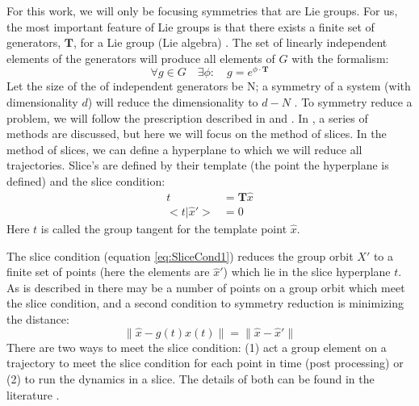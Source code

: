 \documentclass[aip,cha,reprint,
secnumarabic,
nofootinbib, tightenlines,
nobibnotes, showkeys, showpacs,
groupedaddress
]{revtex4-1}
\begin{document}
For this work, we will only be focusing symmetries that are Lie groups.  For us, the most important feature of Lie groups is that there exists a finite set of generators, $\mathbf{T}$, for a Lie group (Lie algebra) \cite{CB}.  The set of linearly independent elements of the generators will produce all elements of $G$ with the formalism:
\begin{equation}
\forall g \in G \quad \exists \phi: \quad  g = e^{\phi \cdot \mathbf{T}}
\label{eq:SymmGen}
\end{equation}
Let the size of the of independent generators be N; a symmetry of a system (with dimensionality $d$) will reduce the dimensionality to $d-N$ \cite{Atl}.
To symmetry reduce a problem, we will follow the prescription described in \cite{SliceCond} and \cite{Atl}.  In \cite{Atl}, a series of methods are discussed, but here we will focus on the method of slices.  In the method of slices, we can define a hyperplane to which we will reduce all trajectories. Slice's are defined by their template (the point the hyperplane is defined) and the slice condition:
\begin{equation}
\begin{split}
t &= \mathbf{T}  \hat{x} \\
<t|\hat{x}'> &= 0
\label{eq:SliceCond1}
\end{split}
\end{equation}
Here $t$ is called the group tangent for the template point $\hat{x}$.

The slice condition (equation \ref{eq:SliceCond1}) reduces the group orbit ${X'}$ to a finite set of points (here the elements are ${\hat{x}'}$) which lie in the slice hyperplane $t$.  As is described in \cite{SliceCond} there may be a number of points on a group orbit which meet the slice condition, and a second condition to symmetry reduction is minimizing the distance:
\begin{equation}
\parallel \hat{x}-g(t)x(t) \parallel = \parallel \hat{x}-\hat{x}' \parallel
\label{eq:SliceCond2}
\end{equation}
There are two ways to meet the slice condition: (1) act a group element on a trajectory to meet the slice condition for each point in time (post processing) or (2) to run the dynamics in a slice.  The details of both can be found in the literature \cite{CB,Eth, SliceCond, Atl}.
\end{document}
